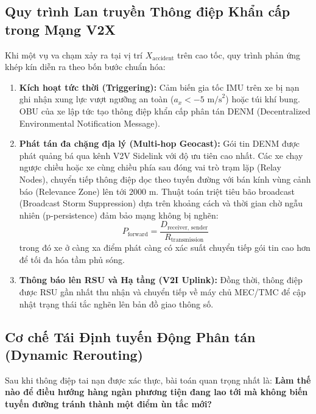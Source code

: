 \documentclass[a4paper]{article}
\begin{document}
\subsection{Quy trình Lan truyền Thông điệp Khẩn cấp trong Mạng V2X}
Khi một vụ va chạm xảy ra tại vị trí $X_{\text{accident}}$ trên cao tốc, quy trình phản ứng khép kín diễn ra theo bốn bước chuẩn hóa:
\begin{enumerate}
    \item \textbf{Kích hoạt tức thời (Triggering):} Cảm biến gia tốc IMU trên xe bị nạn ghi nhận xung lực vượt ngưỡng an toàn ($a_x < -5 \text{ m/s}^2$) hoặc túi khí bung. OBU của xe lập tức tạo thông điệp khẩn cấp phân tán DENM (Decentralized Environmental Notification Message).
    \item \textbf{Phát tán đa chặng địa lý (Multi-hop Geocast):} Gói tin DENM được phát quảng bá qua kênh V2V Sidelink với độ ưu tiên cao nhất. Các xe chạy ngược chiều hoặc xe cùng chiều phía sau đóng vai trò trạm lặp (Relay Nodes), chuyển tiếp thông điệp dọc theo tuyến đường với bán kính vùng cảnh báo (Relevance Zone) lên tới $2000$ m. Thuật toán triệt tiêu bão broadcast (Broadcast Storm Suppression) dựa trên khoảng cách và thời gian chờ ngẫu nhiên (p-persistence) đảm bảo mạng không bị nghẽn:
    \begin{equation}
        P_{\text{forward}} = \frac{D_{\text{receiver, sender}}}{R_{\text{transmission}}}
    \end{equation}
    trong đó xe ở càng xa điểm phát càng có xác suất chuyển tiếp gói tin cao hơn để tối đa hóa tầm phủ sóng.
    \item \textbf{Thông báo lên RSU và Hạ tầng (V2I Uplink):} Đồng thời, thông điệp được RSU gần nhất thu nhận và chuyển tiếp về máy chủ MEC/TMC để cập nhật trạng thái tắc nghẽn lên bản đồ giao thông số.
\end{enumerate}

\subsection{Cơ chế Tái Định tuyến Động Phân tán (Dynamic Rerouting)}
Sau khi thông điệp tai nạn được xác thực, bài toán quan trọng nhất là: \textbf{Làm thế nào để điều hướng hàng ngàn phương tiện đang lao tới mà không biến tuyến đường tránh thành một điểm ùn tắc mới?}
\end{document}
